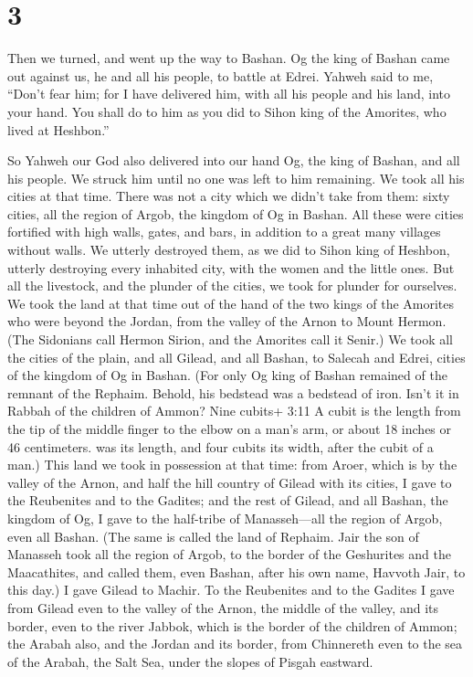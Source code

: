 \hypertarget{section-2}{%
\section{3}\label{section-2}}

 Then we turned, and went up the way to Bashan. Og the king
of Bashan came out against us, he and all his people, to battle at
Edrei.  Yahweh said to me, ``Don't fear him; for I have
delivered him, with all his people and his land, into your hand. You
shall do to him as you did to Sihon king of the Amorites, who lived at
Heshbon.''

 So Yahweh our God also delivered into our hand Og, the king
of Bashan, and all his people. We struck him until no one was left to
him remaining.  We took all his cities at that time. There
was not a city which we didn't take from them: sixty cities, all the
region of Argob, the kingdom of Og in Bashan.  All these
were cities fortified with high walls, gates, and bars, in addition to a
great many villages without walls.  We utterly destroyed
them, as we did to Sihon king of Heshbon, utterly destroying every
inhabited city, with the women and the little ones.  But all
the livestock, and the plunder of the cities, we took for plunder for
ourselves.  We took the land at that time out of the hand of
the two kings of the Amorites who were beyond the Jordan, from the
valley of the Arnon to Mount Hermon.  (The Sidonians call
Hermon Sirion, and the Amorites call it Senir.)  We took
all the cities of the plain, and all Gilead, and all Bashan, to Salecah
and Edrei, cities of the kingdom of Og in Bashan.  (For
only Og king of Bashan remained of the remnant of the Rephaim. Behold,
his bedstead was a bedstead of iron. Isn't it in Rabbah of the children
of Ammon? Nine cubits+ 3:11 A cubit is the length from the tip of the
middle finger to the elbow on a man's arm, or about 18 inches or 46
centimeters. was its length, and four cubits its width, after the cubit
of a man.)  This land we took in possession at that time:
from Aroer, which is by the valley of the Arnon, and half the hill
country of Gilead with its cities, I gave to the Reubenites and to the
Gadites;  and the rest of Gilead, and all Bashan, the
kingdom of Og, I gave to the half-tribe of Manasseh---all the region of
Argob, even all Bashan. (The same is called the land of Rephaim.
 Jair the son of Manasseh took all the region of Argob, to
the border of the Geshurites and the Maacathites, and called them, even
Bashan, after his own name, Havvoth Jair, to this day.)  I
gave Gilead to Machir.  To the Reubenites and to the
Gadites I gave from Gilead even to the valley of the Arnon, the middle
of the valley, and its border, even to the river Jabbok, which is the
border of the children of Ammon;  the Arabah also, and the
Jordan and its border, from Chinnereth even to the sea of the Arabah,
the Salt Sea, under the slopes of Pisgah eastward.

